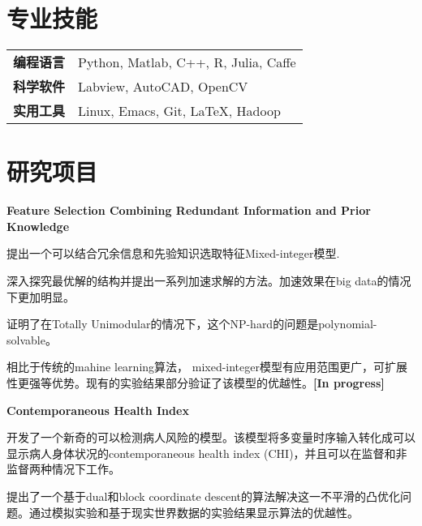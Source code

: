 \documentclass[margin,line,11pt]{resume}
\begin{document}
\begin{resume}
         \vspace{-0.5em}\section{\mysidestyle 专业技能}
\vspace{0.5em}
	\begin{tabular}{ll }
\textbf{编程语言} &Python, Matlab, C++, R, Julia, Caffe\\
\textbf{科学软件}& Labview,  AutoCAD, OpenCV\\
	\textbf{实用工具}& Linux, Emacs, Git, \LaTeX, Hadoop
        \end{tabular}

\clearpage        

        \vspace{-0.5em}\section{\mysidestyle 研究项目}

        \textbf{Feature Selection Combining Redundant Information and Prior Knowledge}
\begin{list2}        
\item 提出一个可以结合冗余信息和先验知识选取特征Mixed-integer模型.
\item 深入探究最优解的结构并提出一系列加速求解的方法。加速效果在big data的情况下更加明显。
\item 证明了在Totally Unimodular的情况下，这个NP-hard的问题是polynomial-solvable。
\item 相比于传统的mahine learning算法， mixed-integer模型有应用范围更广，可扩展性更强等优势。现有的实验结果部分验证了该模型的优越性。\textbf{[In progress]}
\end{list2}

\textbf{Contemporaneous Health Index}
\begin{list2}        
\item 开发了一个新奇的可以检测病人风险的模型。该模型将多变量时序输入转化成可以显示病人身体状况的contemporaneous health index (CHI)，并且可以在监督和非监督两种情况下工作。
\item 提出了一个基于dual和block coordinate descent的算法解决这一不平滑的凸优化问题。通过模拟实验和基于现实世界数据的实验结果显示算法的优越性。
\end{list2}


\end{resume}
\end{document}
